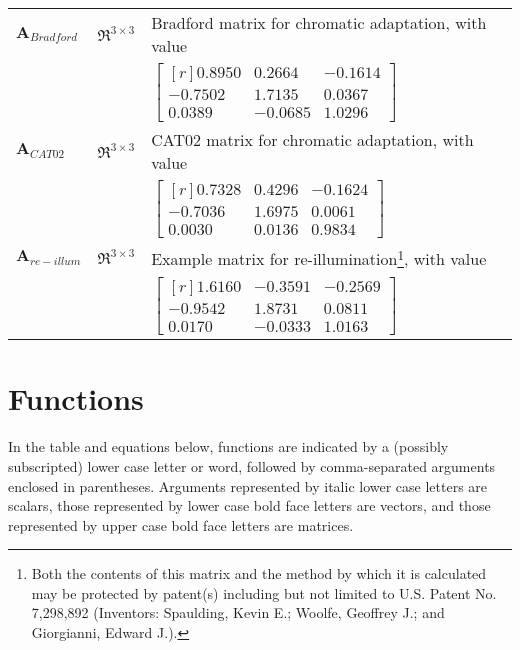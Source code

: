 {\begin{tabularx}{\textwidth}{|l|l|X|}
	$\mathbf{A}_{Bradford}$ & $\Re^{3\times3}$ & Bradford matrix for chromatic adaptation, with value \\
	& & 
		$\begin{bmatrix*}[r]
			0.8950 & 0.2664 & -0.1614 \\
			-0.7502 & 1.7135 & 0.0367 \\
			0.0389 & -0.0685 & 1.0296 
		\end{bmatrix*}$ \\ \hline
	$\mathbf{A}_{CAT02}$ & $\Re^{3\times3}$ & CAT02 matrix for chromatic adaptation, with value \\
	& &
		$\begin{bmatrix*}[r]
			0.7328 & 0.4296 & -0.1624 \\
			-0.7036 & 1.6975 & 0.0061 \\
			0.0030 & 0.0136 & 0.9834 
		\end{bmatrix*}$ \\ \hline
	$\mathbf{A}_{re-illum}$ & $\Re^{3\times3}$ & Example matrix for re-illumination\footnote{Both the contents of this matrix and the method by which it is calculated may be protected by patent(s) including but not limited to U.S. Patent No. 7,298,892 (Inventors: Spaulding, Kevin E.; Woolfe, Geoffrey J.; and Giorgianni, Edward J.).}, with value \\
	& &
		$\begin{bmatrix*}[r]
			1.6160 & -0.3591 & -0.2569 \\
			-0.9542 & 1.8731 & 0.0811 \\
			0.0170 & -0.0333 & 1.0163 
		\end{bmatrix*}$ \\ \hline
\end{tabularx}
}

\section{Functions}
\label{sec:functions}
In the table and equations below, functions are indicated by a (possibly subscripted) lower case letter or word, followed by comma-separated arguments enclosed in parentheses. Arguments represented by italic lower case letters are scalars, those represented by lower case bold face letters are vectors, and those represented by upper case bold face letters are matrices.

